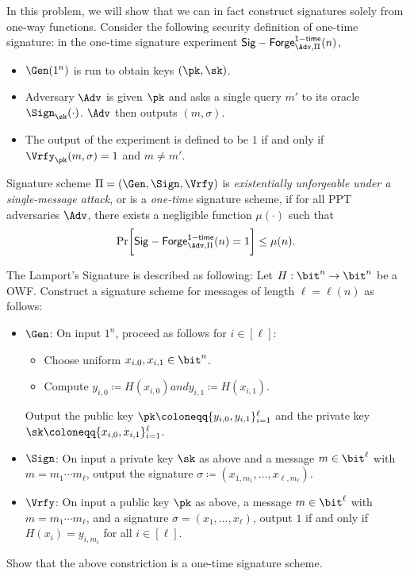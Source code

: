 \begin{problem}\label{p3}
    \leavevmode\par
    In this problem, we will show that we can in fact construct signatures solely from one-way functions. Consider the following security definition of one-time signature: in the one-time signature experiment $\mathsf{Sig-Forge}^{\mathsf{1-time}}_{\Adv, \Pi}(n)$,
    \begin{itemize}
        \item $\Gen(1^n)$ is run to obtain keys $(\pk, \sk)$.
        \item Adversary $\Adv$ is given $\pk$ and asks a single query $m'$ to its oracle $\Sign_\sk(\cdot)$. $\Adv$ then outputs $(m, \sigma)$.
        \item The output of the experiment is defined to be $1$ if and only if $\Vrfy_\pk(m, \sigma) = 1$ and $m\neq m'$.
    \end{itemize}
    Signature scheme $\Pi = (\Gen, \Sign, \Vrfy)$ is \textit{existentially unforgeable under a single-message attack}, or is a \textit{one-time} signature scheme, if for all PPT adversaries $\Adv$, there exists a negligible function $\mu(\cdot)$ such that
    \[
        \Pr\biggl[ \mathsf{Sig-Forge}^{\mathsf{1-time}}_{\Adv, \Pi}(n) =1 \biggr] \le \mu(n).
    \]
    
    The Lamport's Signature is described as following: Let $H : \bit^n\to \bit^n$ be a OWF. Construct a signature scheme for messages of length $\ell = \ell(n)$ as follows:
    \begin{itemize}
        \item $\Gen$: On input $1^n$, proceed as follows for $i\in [\ell]$: 
        \begin{itemize}
            \item Choose uniform $x_{i,0}, x_{i,1}\in\bit^n$.
            \item Compute $y_{i,0} \coloneqq H(x_{i,0}) and y_{i,1} \coloneqq H(x_{i,1})$.
        \end{itemize}
        Output the public key $\pk \coloneqq \{y_{i,0}, y_{i, 1}\}_{i=1}^\ell$ and the private key $\sk\coloneqq \{x_{i,0}, x_{i, 1}\}_{i=1}^\ell$.

        \item $\Sign$: On input a private key $\sk$ as above and a message $m\in\bit^\ell$ with $m=m_1\cdots m_\ell$, output the signature $\sigma\coloneqq (x_{1,m_1} , \ldots,  x_{\ell, m_\ell})$.

        \item $\Vrfy$: On input a public key $\pk$ as above, a message $m\in\bit^\ell$ with $m=m_1\cdots m_\ell$, and a signature $\sigma=(x_1, \ldots, x_\ell)$, output $1$ if and only if $H(x_i) = y_{i,m_i}$ for all $i\in[\ell]$.
    \end{itemize}
    Show that the above constriction is a one-time signature scheme.
\end{problem}



